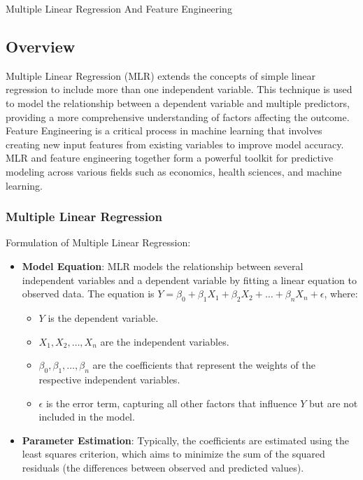 \begin{notes}{Multiple Linear Regression And Feature Engineering}
    \subsection*{Overview}

    Multiple Linear Regression (MLR) extends the concepts of simple linear regression to include more than one independent variable. This technique is used to model the relationship between a dependent 
    variable and multiple predictors, providing a more comprehensive understanding of factors affecting the outcome. Feature Engineering is a critical process in machine learning that involves creating 
    new input features from existing variables to improve model accuracy. MLR and feature engineering together form a powerful toolkit for predictive modeling across various fields such as economics, 
    health sciences, and machine learning. \vspace*{1em}
    
    \subsubsection*{Multiple Linear Regression}
    
    Formulation of Multiple Linear Regression:
    \begin{itemize}
        \item \textbf{Model Equation}: MLR models the relationship between several independent variables and a dependent variable by fitting a linear equation to observed data. The equation is 
        $Y = \beta_0 + \beta_1X_1 + \beta_2X_2 + \dots + \beta_nX_n + \epsilon$, where:
            \begin{itemize}
                \item $Y$ is the dependent variable.
                \item $X_1, X_2, \dots, X_n$ are the independent variables.
                \item $\beta_0, \beta_1, \dots, \beta_n$ are the coefficients that represent the weights of the respective independent variables.
                \item $\epsilon$ is the error term, capturing all other factors that influence $Y$ but are not included in the model.
            \end{itemize}
        \item \textbf{Parameter Estimation}: Typically, the coefficients are estimated using the least squares criterion, which aims to minimize the sum of the squared residuals (the differences 
        between observed and predicted values).
    \end{itemize}
    

\end{notes}
